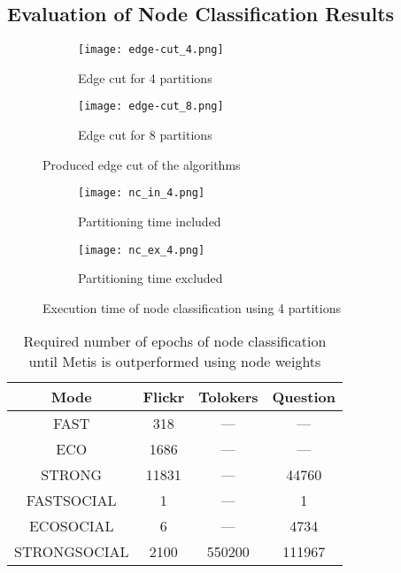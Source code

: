 \documentclass[acmsmall,nonacm,screen,review]{acmart}
\begin{document}
\subsection{Evaluation of Node Classification Results}
\begin{figure}[bt!]
     \centering
     \begin{subfigure}[b]{0.45\textwidth}
         \centering
         \texttt{[image: edge-cut\_4.png]}
         \caption{Edge cut for 4 partitions}
         \label{cut_4}
     \end{subfigure}
     \hfill
     \begin{subfigure}[b]{0.45\textwidth}
         \centering
         \texttt{[image: edge-cut\_8.png]}
         \caption{Edge cut for 8 partitions}
         \label{cut_8}
     \end{subfigure}
     \caption{Produced edge cut of the algorithms}
     \label{cut}
\end{figure}
\begin{figure}[bt!]
     \centering
     \begin{subfigure}[b]{0.45\textwidth}
         \centering
         \texttt{[image: nc\_in\_4.png]}
         \caption{Partitioning time included}
         \label{nc_in_4}
     \end{subfigure}
     \hfill
     \begin{subfigure}[b]{0.45\textwidth}
         \centering
         \texttt{[image: nc\_ex\_4.png]}
         \caption{Partitioning time excluded}
         \label{nc_ex_4}
     \end{subfigure}
     \caption{Execution time of node classification using 4 partitions}
     \label{nc_results}
\end{figure}
\begin{table}[bt!]
\centering
\begin{tabular}{ cccc }
 \centering
  Mode & Flickr  & Tolokers & Question \\ 
 \hline
    FAST &	318	& ---	&--- \\
    ECO	&1686	&---&--- \\
    STRONG	&11831	&---	&44760\\
    FASTSOCIAL	&1	&---	&1 \\
    ECOSOCIAL	&6	&---	&4734 \\
    STRONGSOCIAL	&2100	&550200	&111967\\
\end{tabular}
\caption{Required number of epochs of node classification until Metis is outperformed using node weights}
\label{nc_epochs}
\end{table}
\end{document}
